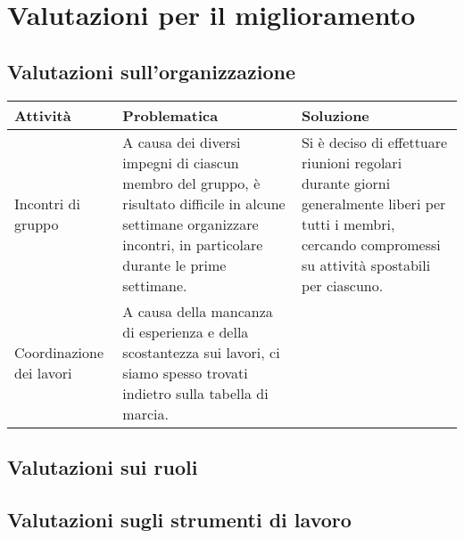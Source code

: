 \chapter{Valutazioni per il miglioramento}\label{valutazioni-per-il-miglioramento}

\section{Valutazioni sull'organizzazione}
\begin{center}
    \begin{xltabular}{\linewidth}{|l|X|X|}
    \hline
    \textbf{Attività} & \textbf{Problematica} & \textbf{Soluzione} \\
    \hline
     Incontri di gruppo & A causa dei diversi impegni di ciascun membro del gruppo, è risultato difficile in alcune settimane organizzare incontri, in particolare durante le prime settimane. & Si è deciso di effettuare riunioni regolari durante giorni generalmente liberi per tutti i membri, cercando compromessi su attività spostabili per ciascuno.\\
     Coordinazione dei lavori & A causa della mancanza di esperienza e della scostantezza sui lavori, ci siamo spesso trovati indietro sulla tabella di marcia. & %

    \hline

    \end{xltabular}
\end{center}

\section{Valutazioni sui ruoli}

\section{Valutazioni sugli strumenti di lavoro}

